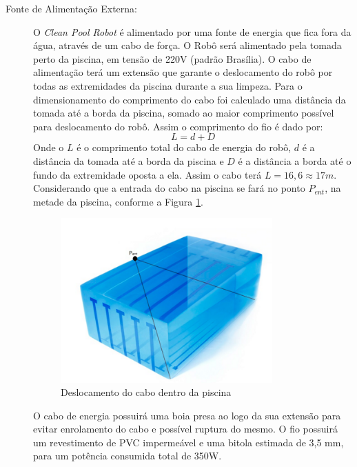 \begin{description}
\item[Fonte de Alimentação Externa:] O \textit{Clean Pool Robot} é alimentado por
uma fonte de energia que fica fora da água, através de um cabo de força. O Robô
será alimentado pela tomada perto da piscina, em tensão de 220V (padrão Brasília).
O cabo de alimentação terá um extensão que garante o deslocamento do robô por todas
as extremidades da piscina durante a sua limpeza. Para o dimensionamento do
comprimento do cabo foi calculado uma distância da tomada até a borda da piscina,
somado ao maior comprimento possível para deslocamento do robô. Assim o comprimento
do fio é dado por:
\begin{displaymath}
  L= d + D
\end{displaymath}
Onde o $L$ é o comprimento total do cabo de energia do robô, $d$ é a distância da
tomada até a borda da piscina e $D$ é a distância a borda até o fundo da
extremidade oposta a ela. Assim o cabo terá $L = 16,6 \approx 17m$. Considerando que
a entrada do cabo na piscina se fará no ponto $P_ {ent}$, na metade da piscina,
conforme a Figura \ref{fig:cable-desloc}.
\par
\begin{figure}[h]
  \centering
  \includegraphics[width=0.8\textwidth]{figures/cable-desloc.png}
  \caption{Deslocamento do cabo dentro da piscina \cite{assumpcao2014}}
  \label{fig:cable-desloc}
\end{figure}
\FloatBarrier
\par
O cabo de energia possuirá uma boia presa ao logo da sua extensão para evitar
enrolamento do cabo e possível ruptura do mesmo. O fio possuirá um revestimento
de PVC impermeável e uma bitola estimada de 3,5 mm, para um potência consumida
total de 350W.


\end{description}
